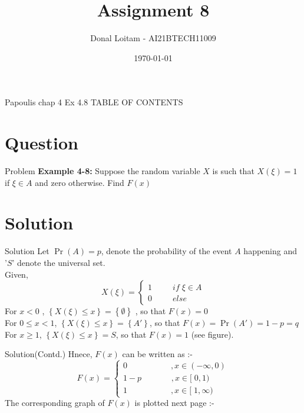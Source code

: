 \documentclass{beamer}
\title{Assignment 8}
\author{Donal Loitam - AI21BTECH11009}
\date{\today}
\providecommand{\pr}[1]{\ensuremath{\Pr\left(#1\right)}}
\providecommand{\brak}[1]{\ensuremath{\left(#1\right)}}
\providecommand{\cbrak}[1]{\ensuremath{\left\{#1\right\}}}
\begin{document}
\begin{frame}
    \titlepage 
\end{frame}

\logo{}


\begin{frame}{Papoulis chap 4 Ex 4.8}
TABLE OF CONTENTS
    \tableofcontents
\end{frame}


\section{Question}
\begin{frame}{Problem}
\textbf{Example 4-8:  }Suppose the random variable $X$ is such that   $X\brak{\xi} = 1$ if $\xi \in A$ and zero otherwise. Find $F(x)$
\end{frame}

\section{Solution}
\begin{frame}{Solution}
  Let $\pr{A} = p$, denote the probability of the event $A$ happening and '$S$' denote the universal set.\\
   Given, \[
        X\brak{\xi}=\left\{
                \begin{array}{ll}
                  1 \;\;\;\;\;\;\;\;\;    if \;\xi \in A \\
                  0  \;\;\;\;\;\;\;\;\;    else
                \end{array}
              \right.
  \]
  For $ x<0 $ , $\cbrak{X\brak{\xi} \le x} = \cbrak{\emptyset}$ , so that $F(x)=0$ \\
  For $ 0 \le x < 1 $, $\cbrak{X\brak{\xi} \le x} = \cbrak{A'}$, so 
that $F(x) = \pr{A'} = 1 - p = q $
For $ x \ge 1 $, $\cbrak{X\brak{\xi} \le x} = S$, so that $F(x) = 1$ (see figure).
\end{frame}

\begin{frame}{Solution(Contd.)}
Hnece, $F(x)$ can be written as :-
        \[
        F(x)=\left\{
                \begin{array}{ll}
                  0  \;\;\;\;\;\;\;\;\;\;\;\;\;\;\;\; \;\; \; , x \in \brak{-\infty,0}  \\
                  1-p  \;\;\;\;\;\;\;\;\;\;\;  \; \;, x \in [\; 0,1)  \\
                  1  \;\;\;\;\;\;\;\;\;\;\;\;\;\;\;\; \;\;\;  , x \in [\;1,\infty)
                  \end{array}
              \right.
       \]
       The corresponding graph of $F(x)$ is plotted next page :-
\end{frame}
\end{document}
